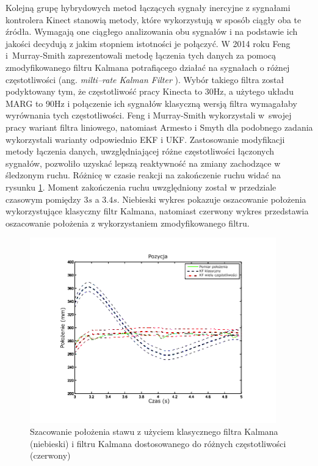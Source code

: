 Kolejną grupę hybrydowych metod łączących sygnały inercyjne z sygnałami kontrolera Kinect stanowią metody, które wykorzystują w sposób ciągły oba te źródła. Wymagają one ciągłego analizowania obu sygnałów i na podstawie ich jakości decydują z jakim stopniem istotności je połączyć. W 2014 roku Feng i~Murray-Smith \cite{Murray-Smith2014} zaprezentowali metodę łączenia tych danych za pomocą zmodyfikowanego filtru Kalmana potrafiącego działać na sygnałach o różnej częstotliwości (ang. \emph{milti--rate Kalman Filter} \cite{Dhuli2009}). Wybór takiego filtra został podyktowany tym, że częstotliwość pracy Kinecta to 30Hz, a użytego układu MARG to 90Hz i połączenie ich sygnałów klasyczną wersją filtra wymagałaby wyrównania tych częstotliwości. Feng i Murray-Smith wykorzystali w~swojej pracy wariant filtra liniowego, natomiast Armesto i Smyth dla podobnego zadania wykorzystali warianty odpowiednio EKF\cite{Armesto01062007} i UKF\cite{Smyth2007}. Zastosowanie modyfikacji metody łączenia danych, uwzględniającej różne częstotliwości łączonych sygnałów, pozwoliło uzyskać lepszą reaktywność na zmiany zachodzące w śledzonym ruchu. Różnicę w czasie reakcji na zakończenie ruchu widać na rysunku \ref{fig:literature:feng}. Moment zakończenia ruchu uwzględniony został w przedziale czasowym pomiędzy $3s$ a $3.4s$. Niebieski wykres pokazuje oszacowanie położenia wykorzystujące klasyczny filtr Kalmana, natomiast czerwony wykres przedstawia oszacowanie położenia z wykorzystaniem zmodyfikowanego filtru.
		
\begin{figure}[!htp]
	\centering 
	\includegraphics[width=0.95\textwidth]{images/Fig03.png}	
	\caption{Szacowanie położenia stawu z użyciem klasycznego filtra Kalmana (niebieski) i filtru Kalmana dostosowanego do różnych częstotliwości (czerwony) \cite{Murray-Smith2014}}
	\label{fig:literature:feng}
\end{figure}
		
